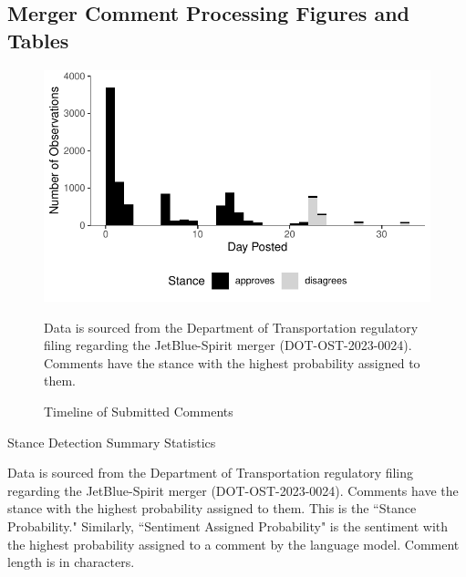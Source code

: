 \documentclass{article}
\let\Oldsubsection\subsection
\renewcommand{\subsection}{\FloatBarrier\Oldsubsection}
\begin{document}
\begin{appendices}
	
	\FloatBarrier
	
	\subsection{Merger Comment Processing Figures and Tables}
	\label{sec:NaturalLanguage_Figs}
	\begin{figure}[h]
		\caption{Timeline of Submitted Comments}
		\label{fig:CommentTimeline}
		\includegraphics{stance_submission_timeline}
		\begin{minipage}{\textwidth} 
			{\footnotesize Data is sourced from the Department of Transportation regulatory filing regarding the JetBlue-Spirit merger  (DOT-OST-2023-0024). Comments have the stance with the highest probability assigned to them.} 
		\end{minipage}
	\end{figure}
	
	\begin{table}[h]
		\caption{Stance Detection Summary Statistics}
		\label{tab:Stance_Summary}
		
		\begin{minipage}{\textwidth} 
			{\footnotesize Data is sourced from the Department of Transportation regulatory filing regarding the JetBlue-Spirit merger  (DOT-OST-2023-0024). Comments have the stance with the highest probability assigned to them. This is the ``Stance Probability." Similarly, ``Sentiment Assigned Probability" is the sentiment with the highest  probability assigned to a comment by the language model. Comment length is in characters.} 
		\end{minipage}
	\end{table}
	

\end{appendices}
\end{document}
